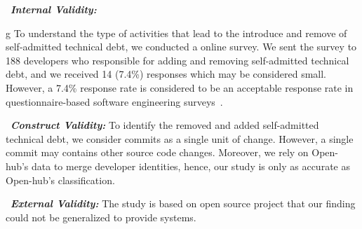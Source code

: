 \noindent~\textbf{\textit{Internal Validity:}}

g
To understand the type of activities that lead to the introduce and remove of self-admitted technical debt, we conducted a online survey. We sent the survey to 188 developers who responsible for adding and removing self-admitted technical debt, and we received 14 (7.4\%) responses which may be considered small. However, a 7.4\% response rate is considered to be an acceptable response rate in questionnaire-based software engineering surveys~\cite{singer2008software}.

\noindent~\textbf{\textit{Construct Validity:}}
To identify the removed and added self-admitted technical debt, we consider commits as a single unit of change. However, a single commit may contains other source code changes. Moreover, we rely on Open-hub's data to merge developer identities, hence, our study is only as accurate as Open-hub's classification.

\noindent~\textbf{\textit{External Validity:}} The study is based on open source project that our finding could not be generalized to provide systems.